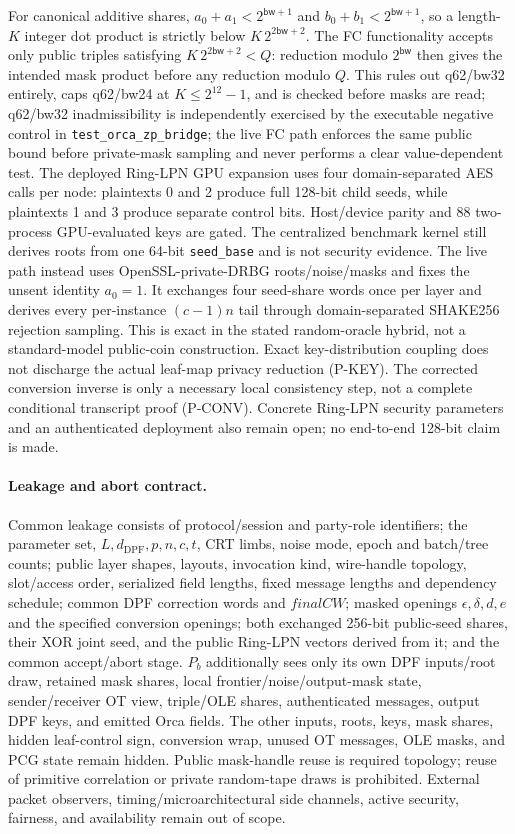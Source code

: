 \documentclass[11pt]{article}
\newcommand{\bw}{\mathsf{bw}}
\newcommand{\dpfd}{d_{\mathrm{DPF}}} %
\begin{document}
For canonical additive shares,
$a_0+a_1<2^{\bw+1}$ and $b_0+b_1<2^{\bw+1}$, so a length-$K$
integer dot product is strictly below $K\,2^{2\bw+2}$. The FC functionality
accepts only public triples satisfying $K\,2^{2\bw+2}<Q$: reduction modulo
$2^\bw$ then gives the intended mask product before any reduction modulo $Q$.
This rules out q62/bw32 entirely, caps q62/bw24 at
$K\leq2^{12}-1$, and is checked before masks are read; q62/bw32
inadmissibility is independently exercised by the executable negative
control in \texttt{test\_orca\_zp\_bridge}; the live FC path enforces the same
public bound before private-mask sampling and never performs a clear
value-dependent test. The deployed Ring-LPN GPU expansion uses four
domain-separated AES calls per node: plaintexts 0 and 2 produce full 128-bit
child seeds, while plaintexts 1 and 3 produce separate control bits.
Host/device parity and 88 two-process GPU-evaluated keys are gated. The
centralized benchmark kernel still derives roots from one 64-bit
\texttt{seed\_base} and is not security evidence. The live path instead uses
OpenSSL-private-DRBG roots/noise/masks and fixes the unsent identity $a_0=1$.
It exchanges four seed-share words once per layer and derives every
per-instance $(c-1)n$ tail through domain-separated SHAKE256 rejection
sampling. This is exact in the stated random-oracle hybrid, not a
standard-model public-coin construction. Exact key-distribution coupling
does not discharge the actual leaf-map privacy reduction (P-KEY).
The corrected conversion inverse is only a necessary local consistency step,
not a complete conditional transcript proof (P-CONV).
Concrete Ring-LPN security parameters and an authenticated deployment also
remain open; no end-to-end 128-bit claim is made.

\paragraph{Leakage and abort contract.}
Common leakage consists of protocol/session and party-role identifiers; the
parameter set, $L,\dpfd,p,n,c,t$, CRT limbs, noise mode, epoch and batch/tree
counts; public layer shapes, layouts, invocation kind, wire-handle topology,
slot/access order, serialized field lengths, fixed message lengths and
dependency schedule; common DPF correction words and
$\mathit{finalCW}$; masked openings
$\epsilon,\delta,d,e$ and the specified conversion openings; both exchanged
256-bit public-seed shares, their XOR joint seed, and the public Ring-LPN
vectors derived from it; and the common accept/abort stage.
$P_b$ additionally sees only its own DPF inputs/root draw, retained mask
shares, local frontier/noise/output-mask state, sender/receiver
OT view, triple/OLE shares, authenticated messages, output DPF keys, and
emitted Orca fields. The other inputs, roots, keys, mask shares, hidden
leaf-control sign, conversion wrap, unused OT messages, OLE masks, and PCG
state remain hidden. Public mask-handle reuse is required topology; reuse of
primitive correlation or private random-tape draws is prohibited. External
packet observers, timing/microarchitectural side channels, active security,
fairness, and availability remain out of scope.
\end{document}
